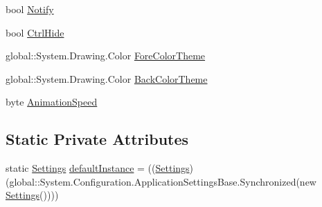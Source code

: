 \begin{DoxyCompactItemize}
\item 
bool \hyperlink{class_sr_p___classroom_inq_1_1_properties_1_1_settings_ad0c83bd5c1a79ad9f1690f5096d48306}{\-Notify}
\item 
bool \hyperlink{class_sr_p___classroom_inq_1_1_properties_1_1_settings_a503512222454f2c3d7bb0dbda6437ac0}{\-Ctrl\-Hide}
\item 
global\-::\-System.\-Drawing.\-Color \hyperlink{class_sr_p___classroom_inq_1_1_properties_1_1_settings_ad3f4ea6ca5ad5d11dc006818a104fb1b}{\-Fore\-Color\-Theme}
\item 
global\-::\-System.\-Drawing.\-Color \hyperlink{class_sr_p___classroom_inq_1_1_properties_1_1_settings_af26cf7b47cfa1a668ce1ebeac8941a18}{\-Back\-Color\-Theme}
\item 
byte \hyperlink{class_sr_p___classroom_inq_1_1_properties_1_1_settings_ac3c244809dca166ec8ee4bf7eb419623}{\-Animation\-Speed}
\end{DoxyCompactItemize}
\subsection*{\-Static \-Private \-Attributes}
\begin{DoxyCompactItemize}
\item 
static \hyperlink{class_sr_p___classroom_inq_1_1_properties_1_1_settings}{\-Settings} \hyperlink{class_sr_p___classroom_inq_1_1_properties_1_1_settings_a0a71ce7c79440c1532000746426ccf1f}{default\-Instance} = ((\hyperlink{class_sr_p___classroom_inq_1_1_properties_1_1_settings}{\-Settings})(global\-::\-System.\-Configuration.\-Application\-Settings\-Base.\-Synchronized(new \hyperlink{class_sr_p___classroom_inq_1_1_properties_1_1_settings}{\-Settings}())))
\end{DoxyCompactItemize}


